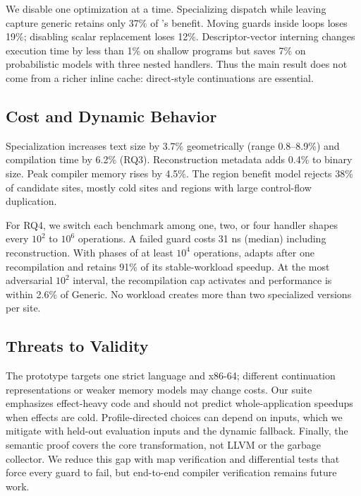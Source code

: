We disable one optimization at a time. Specializing dispatch while leaving
capture generic retains only 37\% of \system's benefit. Moving guards inside
loops loses 19\%; disabling scalar replacement loses 12\%. Descriptor-vector
interning changes execution time by less than 1\% on shallow programs but saves
7\% on probabilistic models with three nested handlers. Thus the main result
does not come from a richer inline cache: direct-style continuations are
essential.

\subsection{Cost and Dynamic Behavior}

Specialization increases text size by 3.7\% geometrically (range 0.8--8.9\%)
and compilation time by 6.2\% (RQ3). Reconstruction metadata adds 0.4\% to
binary size. Peak compiler memory rises by 4.5\%. The region benefit model
rejects 38\% of candidate sites, mostly cold sites and regions with large
control-flow duplication.

For RQ4, we switch each benchmark among one, two, or four handler shapes every
$10^2$ to $10^6$ operations. A failed guard costs 31 ns (median) including
reconstruction. With phases of at least $10^4$ operations, \system adapts after
one recompilation and retains 91\% of its stable-workload speedup. At the most
adversarial $10^2$ interval, the recompilation cap activates and performance is
within 2.6\% of Generic. No workload creates more than two specialized versions
per site.

\subsection{Threats to Validity}

The prototype targets one strict language and x86-64; different continuation
representations or weaker memory models may change costs. Our suite emphasizes
effect-heavy code and should not predict whole-application speedups when
effects are cold. Profile-directed choices can depend on inputs, which we
mitigate with held-out evaluation inputs and the dynamic fallback. Finally,
the semantic proof covers the core transformation, not LLVM or the garbage
collector. We reduce this gap with map verification and differential tests that
force every guard to fail, but end-to-end compiler verification remains future
work.
